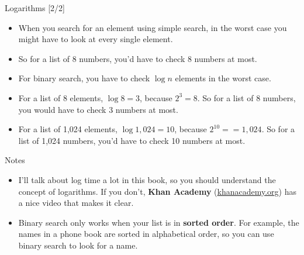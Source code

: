 \documentclass[ignorenonframetext,]{beamer}
\providecommand{\tightlist}{%
  \setlength{\itemsep}{0pt}\setlength{\parskip}{0pt}}
\begin{document}
\begin{frame}{Logarithms {[}2/2{]}}
\protect\hypertarget{logarithms-22}{}

\begin{itemize}
\tightlist
\item
  When you search for an element using simple search, in the worst case
  you might have to look at every single element.
\item
  So for a list of 8 numbers, you'd have to check 8 numbers at most.
\item
  For binary search, you have to check \(\log n\) elements in the worst
  case.
\item
  For a list of 8 elements, \(\log 8 = 3\), because \(2^3 = 8\). So for
  a list of 8 numbers, you would have to check 3 numbers at most.
\item
  For a list of 1,024 elements, \(\log 1,024 = 10\), because
  \(2^{10} == 1,024\). So for a list of 1,024 numbers, you'd have to
  check 10 numbers at most.
\end{itemize}

\end{frame}

\begin{frame}{Notes}
\protect\hypertarget{notes}{}

\begin{itemize}
\tightlist
\item
  I'll talk about log time a lot in this book, so you should understand
  the concept of logarithms. If you don't, \textbf{Khan Academy}
  (\href{https://www.khanacademy.org/}{khanacademy.org}) has a nice
  video that makes it clear.
\item
  Binary search only works when your list is in \textbf{sorted order}.
  For example, the names in a phone book are sorted in alphabetical
  order, so you can use binary search to look for a name.
\end{itemize}

\end{frame}
\end{document}
